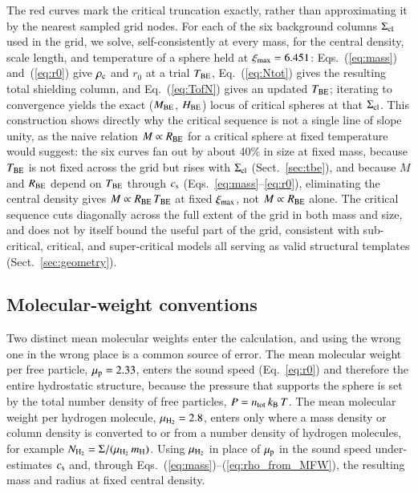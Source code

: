 \documentclass{aa}
\newcommand{\Scloud}{\Sigma_{\rm cl}}
\newcommand{\ximax}{\xi_{\rm max}}
\newcommand{\Tbe}{T_{\rm BE}}
\newcommand{\cs}{c_{\rm s}}
\newcommand{\Rbe}{R_{\rm BE}}
\newcommand{\mH}{m_{\rm H}}
\newcommand{\mup}{\mu_{\rm p}}
\newcommand{\muH}{\mu_{\rm H_2}}
\newcommand{\Mbe}{M_{\rm BE}}
\begin{document}
The red curves mark the critical truncation exactly, rather than
approximating it by the nearest sampled grid nodes. For each of the six
background columns $\Scloud$ used in the grid, we solve, self-consistently
at every mass, for the central density, scale length, and temperature of a
sphere held at $\ximax=6.451$: Eqs.~(\ref{eq:mass}) and~(\ref{eq:r0}) give
$\rho_{\rm c}$ and $r_0$ at a trial $\Tbe$, Eq.~(\ref{eq:Ntot}) gives the
resulting total shielding column, and Eq.~(\ref{eq:TofN}) gives an updated
$\Tbe$; iterating to convergence yields the exact
($\Mbe$, $H_{\rm BE}$) locus of critical spheres at that
$\Scloud$. This construction shows directly why the critical sequence is
not a single line of slope unity, as the naive relation $M\propto\Rbe$ for
a critical sphere at fixed temperature would suggest: the six curves
fan out by about 40\% in size at fixed mass, because $\Tbe$ is not fixed
across the grid but rises with $\Scloud$ (Sect.~\ref{sec:tbe}), and because
$M$ and $\Rbe$ depend on $\Tbe$ through $\cs$
(Eqs.~\ref{eq:mass}--\ref{eq:r0}), eliminating the central density gives
$M\propto\Rbe\,\Tbe$ at fixed $\ximax$, not $M\propto\Rbe$ alone. The
critical sequence cuts diagonally across the full extent of the grid in
both mass and size, and does not by itself bound the useful part of the
grid, consistent with sub-critical, critical, and super-critical models all
serving as valid structural templates (Sect.~\ref{sec:geometry}).

\subsection{Molecular-weight conventions}
\label{sec:mu}

Two distinct mean molecular weights enter the calculation, and using the
wrong one in the wrong place is a common source of error. The mean
molecular weight per free particle, $\mup = 2.33$, enters the sound speed
(Eq.~\ref{eq:r0}) and therefore the entire hydrostatic structure, because
the pressure that supports the sphere is set by the total number density
of free particles, $P = n_{\rm tot}\,k_{{\rm B}}\,T$. The mean
molecular weight per hydrogen molecule, $\muH = 2.8$, enters only where a
mass density or column density is converted to or from a number density of
hydrogen molecules, for example $N_{\rm H_2} = \Sigma/(\muH\,\mH)$.
Using $\muH$ in place of $\mup$ in the sound speed under-estimates $\cs$
and, through Eqs.~(\ref{eq:mass})--(\ref{eq:rho_from_MFW}), the resulting
mass and radius at fixed central density.
\end{document}
